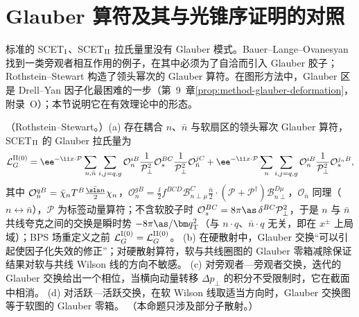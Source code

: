 \section{Glauber 算符及其与光锥序证明的对照}\label{sec:scet-glauber}

标准的 SCET$_{\rm I}$、SCET$_{\rm II}$ 拉氏量里没有 Glauber 模式。Bauer--Lange--Ovanesyan 找到一类旁观者相互作用的例子，在其中必须为了自洽而引入 Glauber 胶子\cite{Bauer:2010cc}；Rothstein--Stewart 构造了领头幂次的 Glauber 算符\cite{RothsteinStewart2016}。在图形方法中，Glauber 区是 Drell--Yan 因子化最困难的一步（第~9~章\cref{prop:method-glauber-deformation}，附录~O）；本节说明它在有效理论中的形态。

\begin{proposition}\label{prop:scet-glauber-operators}
（Rothstein--Stewart\cite{RothsteinStewart2016}。）(a) 存在耦合 $n$、$\bar n$ 与软扇区的领头幂次 Glauber 算符，SCET$_{\rm II}$ 的 Glauber 拉氏量为\cite[式~(5.21)]{RothsteinStewart2016}
\begin{equation}\label{eq:scet-LG}
\mathcal L_G^{\rm II(0)}=\ee^{-\ii x\cdot\mathcal P}\sum_{n,\bar n}\sum_{i,j=q,g}\mathcal O_n^{iB}\frac{1}{\mathcal P_\perp^2}\mathcal O_s^{BC}\frac{1}{\mathcal P_\perp^2}\mathcal O_{\bar n}^{jC}
+\ee^{-\ii x\cdot\mathcal P}\sum_n\sum_{i,j=q,g}\mathcal O_n^{iB}\frac{1}{\mathcal P_\perp^2}\mathcal O_s^{j_nB},
\end{equation}
其中 $\mathcal O_n^{qB}=\bar\chi_nT^B\frac{\bar{\sla n}}{2}\chi_n$，$\mathcal O_n^{gB}=\frac\ii2f^{BCD}\mathcal B^C_{n\perp\mu}\frac{\bar n}{2}\cdot(\mathcal P+\mathcal P^\dagger)\mathcal B^{D\mu}_{n\perp}$，$\mathcal O_{\bar n}$ 同理（$n\leftrightarrow\bar n$），$\mathcal P$ 为标签动量算符；不含软胶子时 $\mathcal O_s^{BC}=8\pi\as\,\delta^{BC}\mathcal P_\perp^2$，于是 $n$ 与 $\bar n$ 共线夸克之间的交换是瞬时势 $-8\pi\as/\bm q_{\mathrm T}^2$（与 $n\cdot q$、$\bar n\cdot q$ 无关，即在 $x^\pm$ 上局域）；BPS 场重定义之前 $\mathcal L_G^{\rm I(0)}=\mathcal L_G^{\rm II(0)}$。
(b) 在硬散射中，Glauber 交换“可以引起使因子化失效的修正”；对硬散射算符，软与共线圈图的 Glauber 零箱减除保证结果对软与共线 Wilson 线的方向不敏感。
(c) 对旁观者—旁观者交换，迭代的 Glauber 交换给出一个相位，当横向动量转移 $\Delta p_\perp$ 的积分不受限制时，它在截面中相消。
(d) 对活跃—活跃交换，在软 Wilson 线取适当方向时，Glauber 交换图等于软图的 Glauber 零箱\cite[第~10.1~节]{RothsteinStewart2016}。
（本命题只涉及部分子散射。）
\end{proposition}

